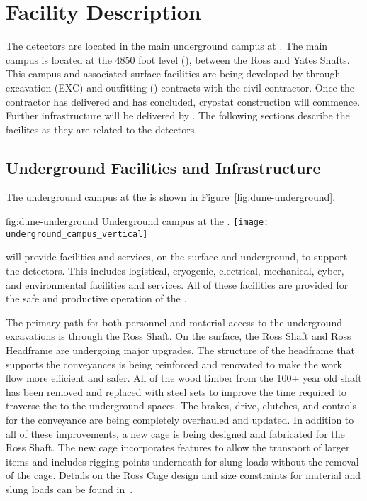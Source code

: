 \chapter{Facility Description}
\label{vl:tc-facility}

The  detectors are located in the main underground campus
at . The main campus is located at the 4850 foot level (), between
the Ross and Yates Shafts. This campus and associated surface
facilities are being developed by  through excavation
(EXC) and outfitting () contracts with the civil
contractor. Once the contractor has delivered and  has
concluded, cryostat construction will commence. Further infrastructure
will be delivered by .  The following sections describe
the facilites as they are related to the  detectors.

\section{Underground Facilities and Infrastructure}
\label{sec:fdsp-coord-uderground-excavation}

The  underground campus at the   is shown in
Figure~\ref{fig:dune-underground}.
\begin{dunefigure}{fig:dune-underground}
  {Underground campus at the .}
  \texttt{[image: underground\_campus\_vertical]}
\end{dunefigure}
 will provide facilities and services, on the surface and
underground, to support the  detectors.  This includes
logistical, cryogenic, electrical, mechanical, cyber, and environmental
facilities and services.  All of these facilities are provided for the
safe and productive operation of the .

The primary path for both personnel and material access to the
underground excavations is through the Ross Shaft. On the surface, the
Ross Shaft and Ross Headframe are undergoing major upgrades. The
structure of the headframe that supports the conveyances is being
reinforced and renovated to make the work flow more efficient and
safer.  All of the wood timber from the 100+ year old shaft has been
removed and replaced with steel sets to improve the time required to
traverse the  to the underground spaces.  The brakes, drive,
clutches, and controls for the conveyance are being completely
overhauled and updated.  In addition to all of these improvements, a
new cage is being designed and fabricated for the Ross Shaft.  The new
cage incorporates features to allow the transport of larger items and
includes rigging points underneath for slung loads without the removal
of the cage.  Details on the Ross Cage design and size constraints for
material and slung loads can be found in~.

